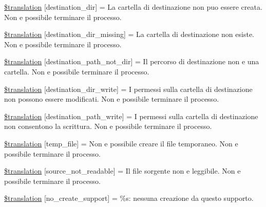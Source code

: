 \begin{DoxyCompactItemize}
\hyperlink{class_8upload_8it___i_t_8php_aff2427c72a2598aefa6d58df1dd18b08}{\$translation} \mbox{[}\textquotesingle{}destination\+\_\+dir\textquotesingle{}\mbox{]} = \textquotesingle{}La cartella di destinazione non puo essere creata. Non e possibile terminare il processo.\textquotesingle{}
\item 
\hyperlink{class_8upload_8it___i_t_8php_a9ef28d3cf09942c6c0a1e77fa09185e8}{\$translation} \mbox{[}\textquotesingle{}destination\+\_\+dir\+\_\+missing\textquotesingle{}\mbox{]} = \textquotesingle{}La cartella di destinazione non esiste. Non e possibile terminare il processo.\textquotesingle{}
\item 
\hyperlink{class_8upload_8it___i_t_8php_a5704a67137126e8c87b7a364175929d4}{\$translation} \mbox{[}\textquotesingle{}destination\+\_\+path\+\_\+not\+\_\+dir\textquotesingle{}\mbox{]} = \textquotesingle{}Il percorso di destinazione non e una cartella. Non e possibile terminare il processo.\textquotesingle{}
\item 
\hyperlink{class_8upload_8it___i_t_8php_a97608ea194a616db49141a0e6dee900c}{\$translation} \mbox{[}\textquotesingle{}destination\+\_\+dir\+\_\+write\textquotesingle{}\mbox{]} = \textquotesingle{}I permessi sulla cartella di destinazione non possono essere modificati. Non e possibile terminare il processo.\textquotesingle{}
\item 
\hyperlink{class_8upload_8it___i_t_8php_a40e4e1962226b89fd76da5819a9602b0}{\$translation} \mbox{[}\textquotesingle{}destination\+\_\+path\+\_\+write\textquotesingle{}\mbox{]} = \textquotesingle{}I permessi sulla cartella di destinazione non consentono la scrittura. Non e possibile terminare il processo.\textquotesingle{}
\item 
\hyperlink{class_8upload_8it___i_t_8php_a2baece8da11e20d45175db91851ec3e3}{\$translation} \mbox{[}\textquotesingle{}temp\+\_\+file\textquotesingle{}\mbox{]} = \textquotesingle{}Non e possibile creare il file temporaneo. Non e possibile terminare il processo.\textquotesingle{}
\item 
\hyperlink{class_8upload_8it___i_t_8php_a922967ca2df0efdd455261142d8e5715}{\$translation} \mbox{[}\textquotesingle{}source\+\_\+not\+\_\+readable\textquotesingle{}\mbox{]} = \textquotesingle{}Il file sorgente non e leggibile. Non e possibile terminare il processo.\textquotesingle{}
\item 
\hyperlink{class_8upload_8it___i_t_8php_a346dfd1ade29f583dd20d345c436859f}{\$translation} \mbox{[}\textquotesingle{}no\+\_\+create\+\_\+support\textquotesingle{}\mbox{]} = \textquotesingle{}\%s\+: nessuna creazione da questo supporto.\textquotesingle{}

\end{DoxyCompactItemize}
